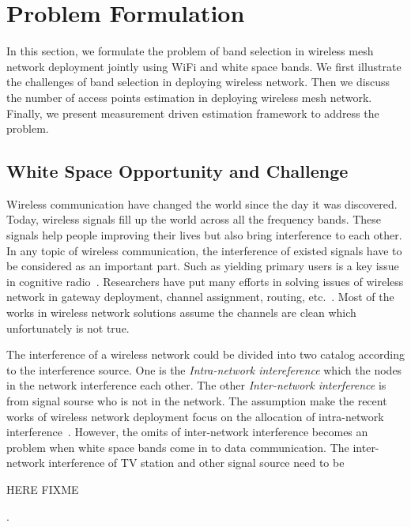 \section{Problem Formulation}
\label{sec:problemformulation}

In this section, we formulate the problem of band selection in wireless 
mesh network deployment jointly using WiFi and white space bands. 
We first illustrate the challenges of band selection
in deploying wireless network. Then we discuss the number of access
 points estimation in deploying wireless mesh network. Finally, we present 
measurement driven estimation framework to address the problem. 
 
\subsection{White Space Opportunity and Challenge}
\label{subsec:motivation}
Wireless communication have changed the world since the day it was discovered.
Today, wireless signals fill up the world across all the frequency bands.
These signals help people improving their lives but also bring interference to each other.
In any topic of wireless communication, the interference of existed signals
 have to be considered as an important part.  Such as yielding primary users
is a key issue in cognitive radio~\cite{haykin2005cognitive}. Researchers have 
put many efforts in solving issues of wireless network in gateway deployment, channel 
assignment, routing, etc.~\cite{he2008optimizing,tang2005interference}.
Most of the works in wireless network solutions assume the channels are clean 
which unfortunately is not true.

The interference of a wireless network could be divided into two catalog according
 to the interference source.
 One is the {\it Intra-network intereference} which the nodes in the 
network interference each other. The other {\it Inter-network interference}
 is from signal sourse who is not in the network. 
The assumption make the recent works of wireless 
network deployment focus on the allocation of intra-network interference~\cite{si2010overview}. 
However, the omits of inter-network interference becomes an problem when 
white space bands come in to data communication. The inter-network 
interference of TV station and other signal source need to be 


HERE FIXME

. 




